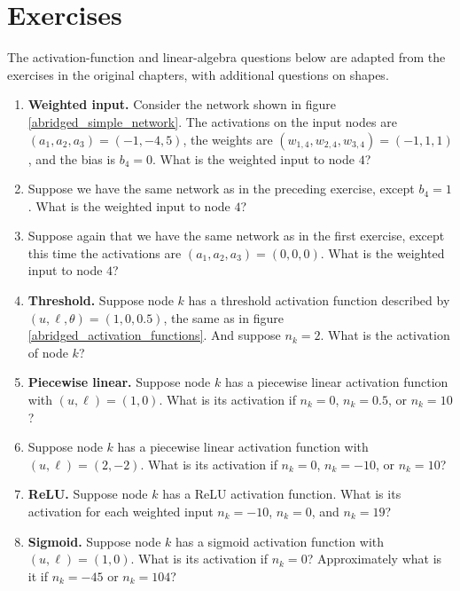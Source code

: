 \clearpage
\section{Exercises}

The activation-function and linear-algebra questions below are adapted from the exercises in the original chapters, with additional questions on shapes.

\begin{enumerate}
\item \textbf{Weighted input.} Consider the network shown in figure \ref{abridged_simple_network}. The activations on the input nodes are $(a_1,a_2,a_3)=(-1,-4,5)$, the weights are $(w_{1,4},w_{2,4},w_{3,4})=(-1,1,1)$, and the bias is $b_4=0$. What is the weighted input to node $4$?

\item Suppose we have the same network as in the preceding exercise, except $b_4=1$. What is the weighted input to node $4$?

\item Suppose again that we have the same network as in the first exercise, except this time the activations are $(a_1,a_2,a_3)=(0,0,0)$. What is the weighted input to node $4$?

\item \textbf{Threshold.} Suppose node $k$ has a threshold activation function described by $(u,\ell,\theta)=(1,0,0.5)$, the same as in figure \ref{abridged_activation_functions}. And suppose $n_k=2$. What is the activation of node $k$?

\item \textbf{Piecewise linear.} Suppose node $k$ has a piecewise linear activation function with $(u,\ell)=(1,0)$. What is its activation if $n_k=0$, $n_k=0.5$, or $n_k=10$?

\item Suppose node $k$ has a piecewise linear activation function with $(u,\ell)=(2,-2)$. What is its activation if $n_k=0$, $n_k=-10$, or $n_k=10$?

\item \textbf{ReLU.} Suppose node $k$ has a ReLU activation function. What is its activation for each weighted input $n_k=-10$, $n_k=0$, and $n_k=19$?

\item \textbf{Sigmoid.} Suppose node $k$ has a sigmoid activation function with $(u,\ell)=(1,0)$. What is its activation if $n_k=0$? Approximately what is it if $n_k=-45$ or $n_k=104$?


\end{enumerate}
